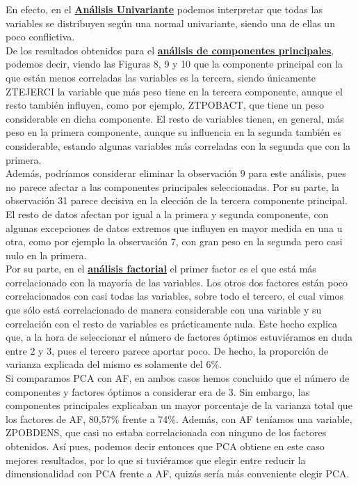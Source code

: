 \documentclass[11pt,a4paper]{article}
\begin{document}
	En efecto, en el \textbf{\underline{Análisis Univariante}} podemos interpretar que todas las variables se distribuyen según una normal univariante, siendo una de ellas un poco conflictiva. \\ 
	
    De los resultados obtenidos para el \textbf{\underline{análisis de componentes principales}}, podemos decir, viendo las Figuras 8, 9 y 10 que la componente principal con la que están menos correladas las variables es la tercera, siendo únicamente ZTEJERCI la variable que más peso tiene en la tercera componente, aunque el resto también influyen, como por ejemplo, ZTPOBACT, que tiene un peso considerable en dicha componente. El resto de variables tienen, en general, más peso en la primera componente, aunque su influencia en la segunda también es considerable, estando algunas variables más correladas con la segunda que con la primera. \\
    
    Además, podríamos considerar eliminar la observación 9 para este análisis, pues no parece afectar a las componentes principales seleccionadas. Por su parte, la observación 31 parece decisiva en la elección de la tercera componente principal. El resto de datos afectan por igual a la primera y segunda componente, con algunas excepciones de datos extremos que influyen en mayor medida en una u otra, como por ejemplo la observación 7, con gran peso en la segunda pero casi nulo en la primera. \\
    
    Por su parte, en el \textbf{\underline{análisis factorial}} el primer factor es el que está más correlacionado con la mayoría de las variables. Los otros dos factores están poco correlacionados con casi todas las variables, sobre todo el tercero, el cual vimos que sólo está correlacionado de manera considerable con una variable y su correlación con el resto de variables es prácticamente nula. Este hecho explica que, a la hora de seleccionar el número de factores óptimos estuviéramos en duda entre 2 y 3, pues el tercero parece aportar poco. De hecho, la proporción de varianza explicada del mismo es solamente del 6\%. \\
    
   
    
    Si comparamos PCA con AF, en ambos casos hemos concluido que el número de componentes y factores óptimos a considerar era de 3. Sin embargo, las componentes principales explicaban un mayor porcentaje de la varianza total que los factores de AF, 80,57\% frente a 74\%. Además, con AF teníamos una variable, ZPOBDENS, que casi no estaba correlacionada con ninguno de los factores obtenidos. Así pues, podemos decir entonces que PCA obtiene en este caso mejores resultados, por lo que si tuviéramos que elegir entre reducir la dimensionalidad con PCA frente a AF, quizás sería más conveniente elegir PCA. \\
	
\end{document}
